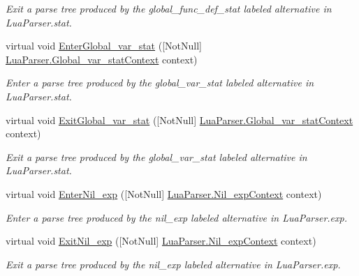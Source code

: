 \begin{DoxyCompactItemize}
\begin{DoxyCompactList}\small\item\em Exit a parse tree produced by the {\ttfamily global\+\_\+func\+\_\+def\+\_\+stat} labeled alternative in Lua\+Parser.\+stat. \end{DoxyCompactList}\item 
virtual void \mbox{\hyperlink{classzlua_1_1_lua_base_listener_a67f5bfdbc89b494e4e8474ba4d019326}{Enter\+Global\+\_\+var\+\_\+stat}} (\mbox{[}Not\+Null\mbox{]} \mbox{\hyperlink{classzlua_1_1_lua_parser_1_1_global__var__stat_context}{Lua\+Parser.\+Global\+\_\+var\+\_\+stat\+Context}} context)
\begin{DoxyCompactList}\small\item\em Enter a parse tree produced by the {\ttfamily global\+\_\+var\+\_\+stat} labeled alternative in Lua\+Parser.\+stat. \end{DoxyCompactList}\item 
virtual void \mbox{\hyperlink{classzlua_1_1_lua_base_listener_a918c1a931ec0803f8ce782d404d9e2c4}{Exit\+Global\+\_\+var\+\_\+stat}} (\mbox{[}Not\+Null\mbox{]} \mbox{\hyperlink{classzlua_1_1_lua_parser_1_1_global__var__stat_context}{Lua\+Parser.\+Global\+\_\+var\+\_\+stat\+Context}} context)
\begin{DoxyCompactList}\small\item\em Exit a parse tree produced by the {\ttfamily global\+\_\+var\+\_\+stat} labeled alternative in Lua\+Parser.\+stat. \end{DoxyCompactList}\item 
virtual void \mbox{\hyperlink{classzlua_1_1_lua_base_listener_acf401fd123113e2bfdaf5c5390d81871}{Enter\+Nil\+\_\+exp}} (\mbox{[}Not\+Null\mbox{]} \mbox{\hyperlink{classzlua_1_1_lua_parser_1_1_nil__exp_context}{Lua\+Parser.\+Nil\+\_\+exp\+Context}} context)
\begin{DoxyCompactList}\small\item\em Enter a parse tree produced by the {\ttfamily nil\+\_\+exp} labeled alternative in Lua\+Parser.\+exp. \end{DoxyCompactList}\item 
virtual void \mbox{\hyperlink{classzlua_1_1_lua_base_listener_a997d90f5a6a982d2bf09d4d2f249908f}{Exit\+Nil\+\_\+exp}} (\mbox{[}Not\+Null\mbox{]} \mbox{\hyperlink{classzlua_1_1_lua_parser_1_1_nil__exp_context}{Lua\+Parser.\+Nil\+\_\+exp\+Context}} context)
\begin{DoxyCompactList}\small\item\em Exit a parse tree produced by the {\ttfamily nil\+\_\+exp} labeled alternative in Lua\+Parser.\+exp. \end{DoxyCompactList}\item 

\end{DoxyCompactItemize}
